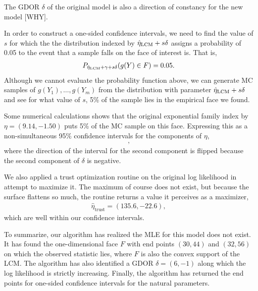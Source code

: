 The GDOR $\delta$ of the original model is also a direction of constancy for the new 
model [WHY].  

In order to construct a one-sided confidence intervals, we need to find the value of 
$s$ for which the the distribution indexed by $\hat{\eta}_{\textrm{LCM}} + s \delta$ assigns a probability
of 0.05 to the event that a sample falls on the face of interest is.  That is,
\begin{align*}
P_{\hat{\eta}_{\textrm{LCM}} + \gamma + s \delta}(g(Y) \in F ) = 0.05.
\end{align*}
Although we cannot evaluate the probability function above, we can generate MC samples 
of $g(Y_1), \ldots, g(Y_m)$ from the distribution with parameter $\hat{\eta}_{\textrm{LCM}} + s 
\delta$ and see for what value of $s$, 5\% of the sample lies in the empirical face we 
found.  

Some numerical calculations shows that the original exponential family index by
 $\eta = (9.14, -1.50)$ puts 5\% of the MC sample on this face.  
Expressing this as a non-simultaneous 95\% confidence intervals for the components of $\eta$,
\begin{align*}
	[9.14, +\infty)\\
	(-\infty, -1.50],
\end{align*}
where the direction of the interval for the second component is flipped because the 
second component of $\delta$ is negative.

We also applied a trust optimization routine on the original log 
likelihood in attempt to maximize it.  The maximum of course does not exist, but
because the surface flattens so much, the routine returns a value it perceives as a maximizer,  
\begin{align*}
 	\hat{\eta}_{\textrm{trust}} = (135.6, -22.6),
 \end{align*}
which are well within our confidence intervals.


To summarize, our algorithm has realized the MLE for this model does not exist.
It has found the one-dimensional face $F$ with end points $(30,44)$  
and $(32,56)$ on which the observed statistic lies, where $F$ is also the
convex support of the LCM.  The algorithm has also identified a GDOR $\delta = (6,-1)$
along which the log likelihood is strictly increasing.  Finally, the algorithm 
has returned the end points for one-sided confidence intervals for the natural
parameters.


